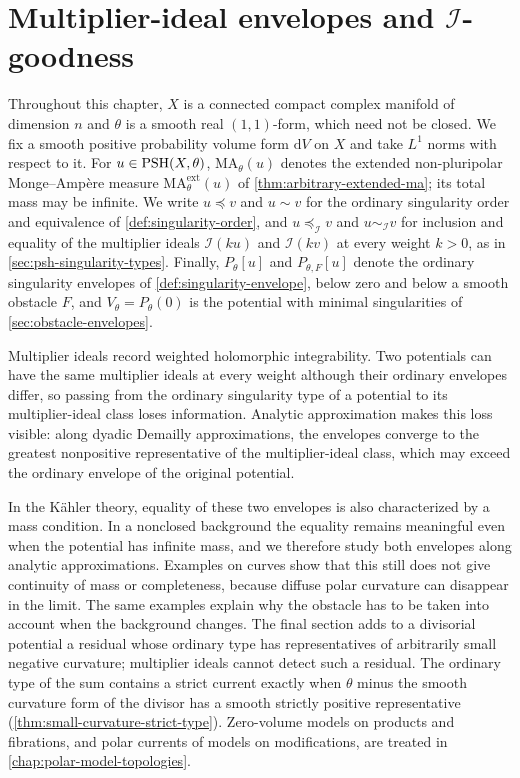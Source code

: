 \chapter{Multiplier-ideal envelopes and \texorpdfstring{$\mathcal I$}{I}-goodness}
\label{chap:hermitian-igood}

Throughout this chapter, $X$ is a connected compact complex manifold of dimension $n$ and $\theta$ is a smooth real $(1,1)$-form, which need not be closed. We fix a smooth positive probability volume form $\mathrm{d}V$ on $X$ and take $L^1$ norms with respect to it. For $u\in\mathrm{PSH}(X,\theta)$, $\mathrm{MA}_\theta(u)$ denotes the extended non-pluripolar Monge--Amp\`ere measure $\mathrm{MA}^{\mathrm{ext}}_\theta(u)$ of \cref{thm:arbitrary-extended-ma}; its total mass may be infinite. We write $u\preceq v$ and $u\sim v$ for the ordinary singularity order and equivalence of \cref{def:singularity-order}, and $u\preceq_{\mathcal I}v$ and $u\sim_{\mathcal I}v$ for inclusion and equality of the multiplier ideals $\mathcal I(ku)$ and $\mathcal I(kv)$ at every weight $k>0$, as in \cref{sec:psh-singularity-types}. Finally, $P_\theta[u]$ and $P_{\theta,F}[u]$ denote the ordinary singularity envelopes of \cref{def:singularity-envelope}, below zero and below a smooth obstacle $F$, and $V_\theta=P_\theta(0)$ is the potential with minimal singularities of \cref{sec:obstacle-envelopes}.

Multiplier ideals record weighted holomorphic integrability. Two potentials can have the same multiplier ideals at every weight although their ordinary envelopes differ, so passing from the ordinary singularity type of a potential to its multiplier-ideal class loses information. Analytic approximation makes this loss visible: along dyadic Demailly approximations, the envelopes converge to the greatest nonpositive representative of the multiplier-ideal class, which may exceed the ordinary envelope of the original potential.

In the K\"ahler theory, equality of these two envelopes is also characterized by a mass condition. In a nonclosed background the equality remains meaningful even when the potential has infinite mass, and we therefore study both envelopes along analytic approximations. Examples on curves show that this still does not give continuity of mass or completeness, because diffuse polar curvature can disappear in the limit. The same examples explain why the obstacle has to be taken into account when the background changes. The final section adds to a divisorial potential a residual whose ordinary type has representatives of arbitrarily small negative curvature; multiplier ideals cannot detect such a residual. The ordinary type of the sum contains a strict current exactly when $\theta$ minus the smooth curvature form of the divisor has a smooth strictly positive representative (\cref{thm:small-curvature-strict-type}). Zero-volume models on products and fibrations, and polar currents of models on modifications, are treated in \cref{chap:polar-model-topologies}.

